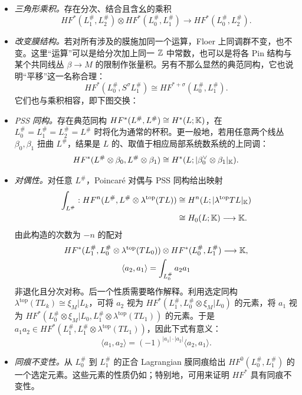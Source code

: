 \begin{itemize}
\item \emph{三角形乘积。}存在分次、结合且含幺的乘积
\begin{equation}\label{eq:12.11}
HF^*(L_1^\#,L_2^\#)\otimes HF^*(L_0^\#,L_1^\#)\longrightarrow HF^*(L_0^\#,L_2^\#).
\end{equation}
\item \emph{改变膜结构。}若对所有涉及的膜施加同一个运算，Floer 上同调群不变，也不变。这里“运算”可以是给分次加上同一 $\mathbb Z$ 中常数，也可以是将各 Pin 结构与某个共同线丛 $\beta\to M$ 的限制作张量积。另有不那么显然的典范同构，它也说明“平移”这一名称合理：
\begin{equation}\label{eq:12.12}
HF^*(L_0^\#,S^\sigma L_1^\#)\cong HF^{*+\sigma}(L_0^\#,L_1^\#).
\end{equation}
它们也与乘积相容，即下图交换：
\item \emph{PSS 同构。}存在典范同构 $HF^*(L^\#,\allowbreak L^\#)\cong H^*(L;\mathbb K)$，在 $L_0^\#=L_1^\#=L_2^\#=L^\#$ 时将化为通常的杯积。更一般地，若用任意两个线丛 $\beta_0,\allowbreak \beta_1$ 扭曲 $L^\#$，结果是 $L$ 的、取值于相应局部系统数系统的上同调：
\begin{equation}\label{eq:12.14}
HF^*(L^\#\otimes\beta_0,L^\#\otimes\beta_1)\cong H^*(L;|\beta_0^\vee\otimes\beta_1|_{\mathbb K}).
\end{equation}
\item \emph{对偶性。}对任意 $L^\#$，Poincaré 对偶与 PSS 同构给出映射
\begin{equation}\label{eq:12.15}
\begin{aligned}
\int_{L^\#}:HF^n(L^\#,L^\#\otimes\lambda^{\mathrm{top}}(TL))
&\cong H^n(L;|\lambda^{\mathrm{top}}TL|_{\mathbb K})\\
&\cong H_0(L;\mathbb K)\longrightarrow\mathbb K.
\end{aligned}
\end{equation}
由此构造的次数为 $-n$ 的配对
\[
\begin{gathered}
HF^*(L_1^\#,L_0^\#\otimes\lambda^{\mathrm{top}}(TL_0))\otimes HF^*(L_0^\#,L_1^\#)\longrightarrow\mathbb K,\\
\langle a_2,a_1\rangle=\int_{L_0^\#}a_2a_1
\end{gathered}
\]
非退化且分次对称。后一个性质需要略作解释。利用选定同构 $\lambda^{\mathrm{top}}(TL_k)\cong\xi_M|L_k$，可将 $a_2$ 视为 $HF^*(L_1^\#,\allowbreak L_0^\#\otimes\xi_M|L_0)$ 的元素，将 $a_1$ 视为
$HF^*(L_0^\#\otimes\xi_M|L_0,\allowbreak L_1^\#\otimes\lambda^{\mathrm{top}}(TL_1))$ 的元素。于是 $a_1a_2\in HF^*(L_1^\#,\allowbreak L_1^\#\otimes\lambda^{\mathrm{top}}(TL_1))$，因此下式有意义：
\[
\langle a_1,a_2\rangle=(-1)^{|a_1|\cdot|a_2|}\langle a_2,a_1\rangle.
\]
\item \emph{同痕不变性。}从 $L_0^\#$ 到 $L_1^\#$ 的正合 Lagrangian 膜同痕给出 $HF^0(L_0^\#,\allowbreak L_1^\#)$ 的一个选定元素。这些元素的性质仍如；特别地，可用来证明 $HF^*$ 具有同痕不变性。
\end{itemize}
